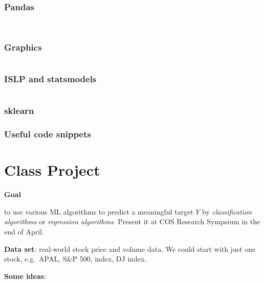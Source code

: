 \documentclass[
  letterpaper,
  DIV=11,
  numbers=noendperiod]{scrreprt}
\begin{document}
\subsection{Pandas}\label{pandas-10}

\begin{verbatim}


\end{verbatim}

\subsection{Graphics}\label{graphics-10}

\begin{verbatim}

\end{verbatim}

\subsection{ISLP and statsmodels}\label{islp-and-statsmodels-8}

\begin{verbatim}
\end{verbatim}

\subsection{sklearn}\label{sklearn-8}

\subsection{Useful code snippets}\label{useful-code-snippets-5}


\chapter{Class Project}\label{class-project}

\textbf{Goal}

to use various ML algorithms to predict a meaningful target \(Y\) by
\emph{classification algorithms} or \emph{regression algorithms}.
Present it at COS Research Sympsium in the end of April.

\textbf{Data set}: real-world stock price and volume data. We could
start with just one stock, e.g.~APAL, S\&P 500, index, DJ index.

\textbf{Some ideas}:
\end{document}
